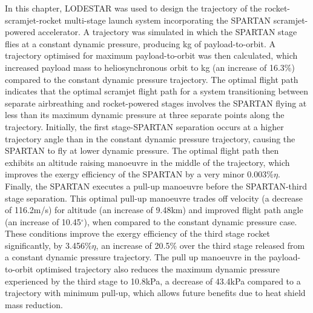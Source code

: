 In this chapter, LODESTAR was used to design the trajectory of the rocket-scramjet-rocket multi-stage launch system incorporating the SPARTAN scramjet-powered accelerator. 
A trajectory was simulated in which the SPARTAN stage flies at a constant dynamic pressure, producing \PayloadToOrbitConstq kg of payload-to-orbit. 
A trajectory optimised for maximum payload-to-orbit was then calculated, which increased payload mass to heliosynchronous orbit to \PayloadToOrbitStandard kg (an increase of 16.3\%) compared to the constant dynamic pressure trajectory.
  The optimal flight path indicates that the optimal scramjet flight path for a system transitioning between separate airbreathing and rocket-powered stages involves the SPARTAN flying at less than its maximum dynamic pressure at three separate points along the trajectory. 
  Initially, the first stage-SPARTAN separation occurs at a higher trajectory angle than in the constant dynamic pressure trajectory, causing the SPARTAN to fly at lower dynamic pressure. 
  The optimal flight path then exhibits an altitude raising manoeuvre in the middle of the trajectory, which improves the exergy efficiency of the SPARTAN by a very minor 0.003\%$\eta$. 
  Finally, the SPARTAN executes a pull-up manoeuvre before the SPARTAN-third stage separation. This optimal pull-up manoeuvre trades off velocity (a decrease of 116.2m/s) for altitude (an increase of 9.48km) and improved flight path angle (an increase of 10.45$^\circ$), when compared to the constant dynamic pressure case. 
  These conditions improve the exergy efficiency of the third stage rocket significantly, by 3.456\%$\eta$, an increase of 20.5\% over the third stage released from a constant dynamic pressure trajectory. 
 The pull up manoeuvre in the payload-to-orbit optimised trajectory also reduces the maximum dynamic pressure experienced by the third stage to 10.8kPa, a decrease of 43.4kPa compared to a trajectory with minimum pull-up, which allows future benefits due to heat shield mass reduction.  

